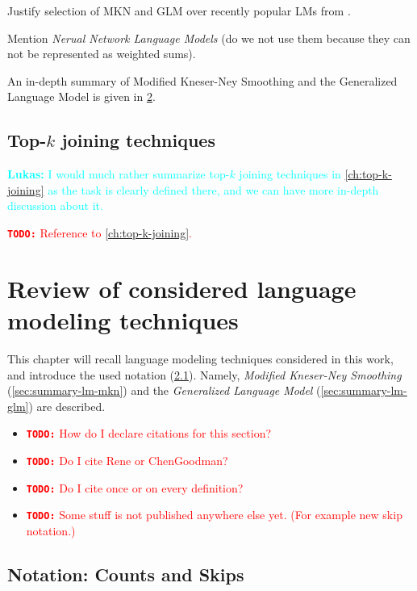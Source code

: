 \documentclass[11pt,a4paper]{report}
\newenvironment{draft}{\color{draftcolor}}{}
\newcommand{\todo}[1]{\textcolor{red}{{\footnotesize\textbf{\texttt{TODO:}}} #1}}
\newcommand{\lukas}[1]{\textcolor{cyan}{{\footnotesize\textbf{Lukas:}} #1}}
\begin{document}
\begin{draft}
Justify selection of MKN and GLM over recently popular LMs from
\parencite{Chelba2013}.

Mention \emph{Nerual Network Language Models} \parencite{Bengio2003,Mikolov2012}
(do we not use them because they can not be represented as weighted sums).
\end{draft}

An in-depth summary of Modified Kneser-Ney Smoothing and the Generalized
Language Model is given in \cref{ch:review-lm}.

\section{Top-$k$ joining techniques}

\lukas{I would much rather summarize top-$k$ joining techniques in
\cref{ch:top-k-joining} as the task is clearly defined there, and we can have
more in-depth discussion about it.}

\todo{Reference to \cref{ch:top-k-joining}.}

\chapter{Review of considered language modeling techniques}
\label{ch:review-lm}

This chapter will recall language modeling techniques considered in this work,
and introduce the used notation (\cref{sec:summary-notation}).
Namely, \emph{Modified Kneser-Ney Smoothing} (\cref{sec:summary-lm-mkn})
and the \emph{Generalized Language Model} (\cref{sec:summary-lm-glm})
are described.

\begin{itemize}
  \item \todo{How do I declare citations for this section?}
  \item \todo{Do I cite Rene or ChenGoodman?}
  \item \todo{Do I cite once or on every definition?}
  \item \todo{Some stuff is not published anywhere else yet. (For example new
    skip notation.)}
\end{itemize}

\section{Notation: Counts and Skips}
\label{sec:summary-notation}
\end{document}
